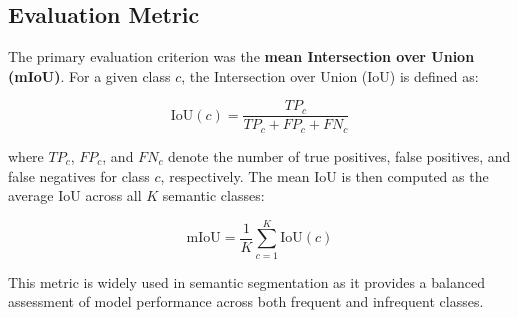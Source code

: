 \subsection{Evaluation Metric}
\label{subsec:evaluation_metric}
The primary evaluation criterion was the \textbf{mean Intersection over Union (mIoU)}. For a given class $c$, the Intersection over Union (IoU) is defined as:

$$
\text{IoU}(c) = \frac{TP_c}{TP_c + FP_c + FN_c}
$$

where $TP_c$, $FP_c$, and $FN_c$ denote the number of true positives, false positives, and false negatives for class $c$, respectively. The mean IoU is then computed as the average IoU across all $K$ semantic classes:

$$
\text{mIoU} = \frac{1}{K} \sum_{c=1}^{K} \text{IoU}(c)
$$

This metric is widely used in semantic segmentation as it provides a balanced assessment of model performance across both frequent and infrequent classes.
